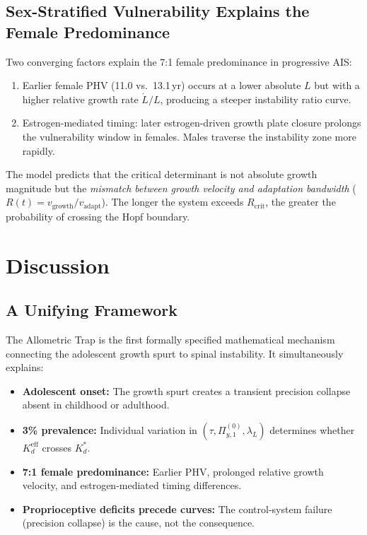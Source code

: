 \documentclass[12pt, letterpaper]{article}
\newcommand{\Kdcrit}{K_d^{*}}
\newcommand{\Kdeff}{K_d^{\mathrm{eff}}}
\newcommand{\Piy}{\Pi_{y,1}}
\newcommand{\Rt}{R(t)}
\begin{document}
\subsection{Sex-Stratified Vulnerability Explains the Female Predominance}

Two converging factors explain the 7:1 female predominance in progressive AIS:

\begin{enumerate}[label=\arabic*.]
  \item Earlier female PHV (11.0 vs.\ 13.1\,yr) occurs at a lower absolute $L$
    but with a higher relative growth rate $\dot{L}/L$, producing a steeper
    instability ratio curve.
  \item Estrogen-mediated timing: later estrogen-driven growth plate closure
    prolongs the vulnerability window in females. Males traverse the instability
    zone more rapidly.
\end{enumerate}

The model predicts that the critical determinant is not absolute growth magnitude
but the \emph{mismatch between growth velocity and adaptation bandwidth}
($\Rt = v_{\mathrm{growth}}/v_{\mathrm{adapt}}$). The longer the system
exceeds $R_{\mathrm{crit}}$, the greater the probability of crossing
the Hopf boundary.

\section{Discussion}

\subsection{A Unifying Framework}

The Allometric Trap is the first formally specified mathematical mechanism
connecting the adolescent growth spurt to spinal instability. It simultaneously
explains:

\begin{itemize}
  \item \textbf{Adolescent onset:} The growth spurt creates a transient
    precision collapse absent in childhood or adulthood.
  \item \textbf{3\% prevalence:} Individual variation in $(\tau, \Piy^{(0)},
    \lambda_L)$ determines whether $\Kdeff$ crosses $\Kdcrit$.
  \item \textbf{7:1 female predominance:} Earlier PHV, prolonged relative growth
    velocity, and estrogen-mediated timing differences.
  \item \textbf{Proprioceptive deficits precede curves:} The control-system
    failure (precision collapse) is the cause, not the consequence.
\end{itemize}
\end{document}
